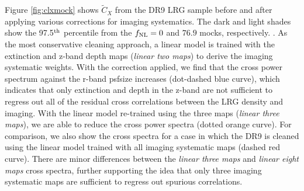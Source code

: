 Figure \ref{fig:clxmock} shows $\tilde{C}_{X}$ from the DR9 LRG sample before and after applying various corrections for imaging systematics. The dark and light shades show the 97.5$^{\rm th}$ percentile from the $f_{\rm NL}=0$ and $76.9$ mocks, respectively. . As the most conservative cleaning approach, a linear model is trained with the extinction and z-band depth maps (\textit{linear two maps}) to derive the imaging systematic weights. With the correction applied, we find that the cross power spectrum against the r-band psfsize increases (dot-dashed blue curve), which indicates that only extinction and depth in the z-band are not sufficient to regress out all of the residual cross correlations between the LRG density and imaging. With the linear model re-trained using the three maps (\textit{linear three maps}), we are able to reduce the cross power spectra (dotted orange curve). For comparison, we also show the cross spectra for a case in which the DR9 is cleaned using the linear model trained with all imaging systematic maps (dashed red curve). There are minor differences between the \textit{linear three maps} and \textit{linear eight maps} cross spectra, further supporting the idea that only three imaging systematic maps are sufficient to regress out spurious correlations.

